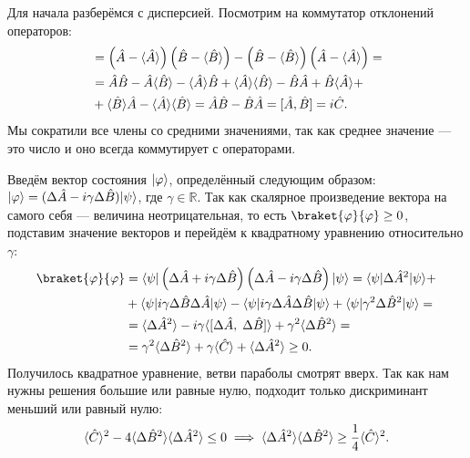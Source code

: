 Для начала разберёмся с дисперсией. Посмотрим на коммутатор отклонений
операторов:
\begin{align*}
  [\Delta \hat A, \Delta \hat B] &= \left( \hat A - \mean{\hat A} \right)
  \left( \hat B - \mean{\hat B} \right) - \left( \hat B - \mean{\hat B} \right)
  \left( \hat A - \mean{\hat A} \right) =\\
  &= \hat A \hat B - \hat A \mean{\hat B} - \mean{\hat A} \hat B +
  \mean{\hat A} \mean{\hat B} - \hat B \hat A + \hat B \mean{\hat A} + \\
  &+ \mean{\hat B} \hat A - \mean{\hat A} \mean{\hat B} =
  \hat A \hat B - \hat B \hat A = [\hat A, \hat B] = i\hat C.
\end{align*}
Мы сократили все члены со средними значениями, так как среднее значение --- это
число и оно всегда коммутирует с операторами.

Введём вектор состояния $\lvert\varphi\rangle$, определённый следующим образом:
$\lvert\varphi\rangle = (\Delta\hat A - i\gamma\Delta\hat B)\lvert\psi\rangle$, где $\gamma
  \in \mathbb{R}$. Так как скалярное произведение вектора на самого себя ---
величина неотрицательная, то есть $\braket{\varphi}{\varphi} \geq 0$, подставим
значение векторов и перейдём к квадратному уравнению относительно $\gamma$:
\begin{align*}
  \braket{\varphi}{\varphi} &= \bra{\psi} \left( \Delta \hat A + i \gamma \Delta \hat B \right)
  \left( \Delta \hat A - i \gamma \Delta \hat B \right) \ket{\psi} =
  \bra{\psi} \Delta \hat{A}^2 \ket{\psi} + \\
  &+ \bra{\psi} i \gamma \Delta \hat{B} \Delta \hat{A} \ket{\psi} -
  \bra{\psi} i \gamma \Delta \hat{A} \Delta \hat{B} \ket{\psi} +
  \bra{\psi} \gamma^2 \Delta \hat{B}^2 \ket{\psi} = \\
  &= \mean{\Delta \hat A^2} - i \gamma \mean{[\Delta \hat{A}, \; \Delta \hat{B}]} +
  \gamma^2 \mean{\Delta \hat B^2} = \\
  &= \gamma^2 \mean{\Delta \hat B^2} + \gamma \mean{\hat{C}} + \mean{\Delta \hat A^2} \geq 0.
\end{align*}
Получилось квадратное уравнение, ветви параболы смотрят вверх. Так как нам
нужны решения большие или равные нулю, подходит только дискриминант меньший или
равный нулю:
\[
  \langle \hat C \rangle^2 - 4 \langle \Delta \hat B^2 \rangle \langle \Delta \hat A^2 \rangle \leq 0 \implies
  \langle \Delta \hat A^2 \rangle \langle \Delta \hat B^2 \rangle \geq \frac{1}{4} \langle \hat C \rangle^2.
\]
\qedsq
